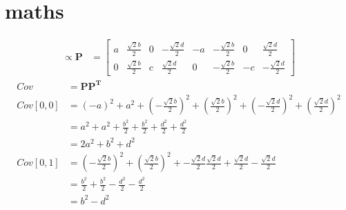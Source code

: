 \section{maths}

\begin{align*}
    \propto
    \mathbf{P} & =
    \left[
        \begin{matrix}
            a & \frac{\sqrt{2} b}{2} & 0 & - \frac{\sqrt{2} d}{2} & - a & - \frac{\sqrt{2} b}{2} & 0   & \frac{\sqrt{2} d}{2}   \\
            0 & \frac{\sqrt{2} b}{2} & c & \frac{\sqrt{2} d}{2}   & 0   & - \frac{\sqrt{2} b}{2} & - c & - \frac{\sqrt{2} d}{2}
        \end{matrix}
        \right]
\end{align*}
\begin{align*}
    Cov      & = \mathbf{P} \mathbf{P}^\mathbf{T}                                                                                                                                                                 \\
    Cov[0,0] & = \left(- a\right)^{2} + a^{2} + \left(- \frac{\sqrt{2} b}{2}\right)^{2} + \left(\frac{\sqrt{2} b}{2}\right)^{2} + \left(- \frac{\sqrt{2} d}{2}\right)^{2} + \left(\frac{\sqrt{2} d}{2}\right)^{2} \\
             & = a^{2} + a^{2} + \frac{b^{2}}{2} + \frac{b^{2}}{2} + \frac{d^{2}}{2} + \frac{d^{2}}{2}                                                                                                            \\
             & = 2 a^{2} + b^{2} + d^{2}                                                                                                                                                                          \\
    Cov[0,1] & = \left(- \frac{\sqrt{2} b}{2}\right)^{2} + \left(\frac{\sqrt{2} b}{2}\right)^{2} + - \frac{\sqrt{2} d}{2} \frac{\sqrt{2} d}{2} + \frac{\sqrt{2} d}{2} - \frac{\sqrt{2} d}{2}                      \\
             & = \frac{b^{2}}{2} + \frac{b^{2}}{2} - \frac{d^{2}}{2} - \frac{d^{2}}{2}                                                                                                                            \\
             & = b^{2} - d^{2}                                                                                                                                                                                    \\

\end{align*}
